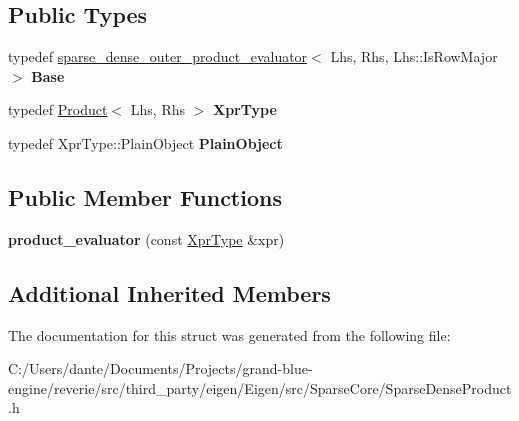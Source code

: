 \subsection*{Public Types}
\begin{DoxyCompactItemize}
\item 
\mbox{\label{struct_eigen_1_1internal_1_1product__evaluator_3_01_product_3_01_lhs_00_01_rhs_00_01_default_pro494452499cb2dffb7b0f87034815802e_ab4c0c3d8ddd6499a9386676189a562c3}} 
typedef \mbox{\hyperlink{struct_eigen_1_1internal_1_1sparse__dense__outer__product__evaluator}{sparse\+\_\+dense\+\_\+outer\+\_\+product\+\_\+evaluator}}$<$ Lhs, Rhs, Lhs\+::\+Is\+Row\+Major $>$ {\bfseries Base}
\item 
\mbox{\label{struct_eigen_1_1internal_1_1product__evaluator_3_01_product_3_01_lhs_00_01_rhs_00_01_default_pro494452499cb2dffb7b0f87034815802e_ac9eec4403af6b002077895b711912b8c}} 
typedef \mbox{\hyperlink{class_eigen_1_1_product}{Product}}$<$ Lhs, Rhs $>$ {\bfseries Xpr\+Type}
\item 
\mbox{\label{struct_eigen_1_1internal_1_1product__evaluator_3_01_product_3_01_lhs_00_01_rhs_00_01_default_pro494452499cb2dffb7b0f87034815802e_a296b3465579c688b89614b4322ae5a48}} 
typedef Xpr\+Type\+::\+Plain\+Object {\bfseries Plain\+Object}
\end{DoxyCompactItemize}
\subsection*{Public Member Functions}
\begin{DoxyCompactItemize}
\item 
\mbox{\label{struct_eigen_1_1internal_1_1product__evaluator_3_01_product_3_01_lhs_00_01_rhs_00_01_default_pro494452499cb2dffb7b0f87034815802e_a879b42eced783ff618c63e03bc15ad43}} 
{\bfseries product\+\_\+evaluator} (const \mbox{\hyperlink{class_eigen_1_1_product}{Xpr\+Type}} \&xpr)
\end{DoxyCompactItemize}
\subsection*{Additional Inherited Members}


The documentation for this struct was generated from the following file\+:\begin{DoxyCompactItemize}
\item 
C\+:/\+Users/dante/\+Documents/\+Projects/grand-\/blue-\/engine/reverie/src/third\+\_\+party/eigen/\+Eigen/src/\+Sparse\+Core/Sparse\+Dense\+Product.\+h\end{DoxyCompactItemize}
